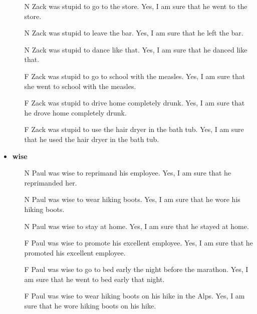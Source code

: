 \documentclass[11pt,fleqn]{article}
\newcommand{\6}{\mbox{$[\hspace*{-.6mm}[$}}
\newcommand{\9}{\mbox{$]\hspace*{-.6mm}]$}}
\begin{document}
\begin{itemize}[leftmargin=10pt,itemsep=-1pt]
\begin{enumerate}[leftmargin=10pt,topsep=0pt,itemsep=0pt]
\item[N]  	Zack was stupid to go to the store.	Yes, I am sure that he went to the store.
\item[N]  	Zack was stupid to leave the bar.	Yes, I am sure that he left the bar.
\item[N]  	Zack was stupid to dance like that.	Yes, I am sure that he danced like that.
\item[F]  	Zack was stupid to go to school with the measles.	Yes, I am sure that she went to school with the measles.
\item[F]  	Zack was stupid to drive home completely drunk.	Yes, I am sure that he drove home completely drunk.
\item[F]  	Zack was stupid to use the hair dryer in the bath tub.	Yes, I am sure that he used the hair dryer in the bath tub.

\end{enumerate}

\item {\bf wise}

\begin{enumerate}[leftmargin=10pt,topsep=0pt,itemsep=0pt]

\item[N]  	Paul was wise to reprimand his employee.	Yes, I am sure that he reprimanded her.
\item[N]  	Paul was wise to wear hiking boots.	Yes, I am sure that he wore his hiking boots.
\item[N]  	Paul was wise to stay at home.	Yes, I am sure that he stayed at home.
\item[F]  	Paul was wise to promote his excellent employee.	Yes, I am sure that he promoted his excellent employee.
\item[F]  	Paul was wise to go to bed early the night before the marathon.	Yes, I am sure that he went to bed early that night.
\item[F]  	Paul was wise to wear hiking boots on his hike in the Alps.	Yes, I am sure that he wore hiking boots on his hike.

\end{enumerate}

\end{itemize}



\end{document}
